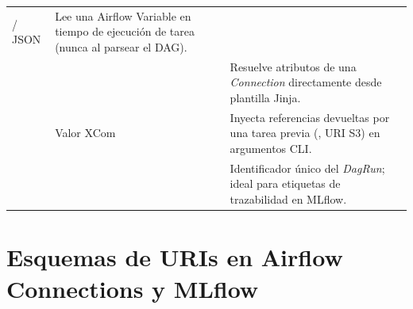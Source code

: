 \begin{table}[htbp]
\begin{tabularx}{\textwidth}{@{}L{5.5cm} L{2.7cm} Y@{}}
 / JSON &
Lee una Airflow Variable en tiempo de ejecución de tarea (nunca al parsear el DAG). \\
 &
 &
Resuelve atributos de una \textit{Connection} directamente desde plantilla Jinja. \\
 &
Valor XCom &
Inyecta referencias devueltas por una tarea previa (, URI S3) en argumentos CLI. \\
 &
 &
Identificador único del \textit{DagRun}; ideal para etiquetas de trazabilidad en MLflow. \\
\bottomrule
\end{tabularx}
\end{table}

\section{Esquemas de URIs en Airflow Connections y MLflow}\label{sec:cheat-uris}

